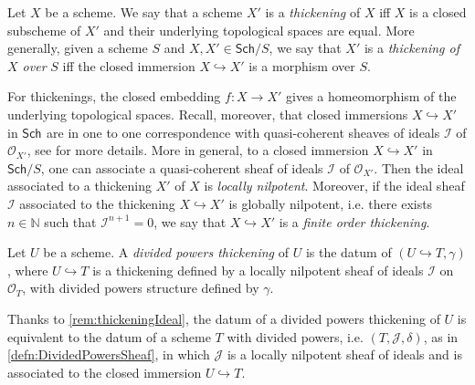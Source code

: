 \begin{defn}[Thickening]
	Let $X$ be a scheme.
	We say that a scheme $X'$ is a {\em thickening} of $X$ iff
	$X$ is a closed subscheme of $X'$ and their underlying topological
	spaces are equal.
	More generally, given a scheme $S$ and $X, X' \in \mathsf{Sch}/S$,
	we say that $X'$ is a {\em thickening of $X$ over} $S$ iff
	the closed immersion $X \hookrightarrow X'$ is a morphism over $S$.
\end{defn}


\begin{rem}[]\label{rem:thickeningIdeal}
	For thickenings, the closed embedding $f\colon X \to X'$ gives a homeomorphism
	of the underlying topological spaces.
	Recall, moreover, that closed immersions $X \hookrightarrow X'$ in $\mathsf{Sch}_{  }$
	are in one to one correspondence with quasi-coherent sheaves of ideals
	$\mathcal{I}$ of $\mathcal{O}_{ X' }$, see
	\cite[\href{https://stacks.math.columbia.edu/tag/01QN}{Section 01QN}]{SP}
	for more details.
	More in general, to a closed immersion $X \hookrightarrow X'$ in
	$\mathsf{Sch}/S$, one can associate a quasi-coherent sheaf of ideals
	$\mathcal{I}$ of $\mathcal{O}_{ X' }$.
	Then the ideal associated to a thickening $X'$ of $X$ 
	is {\em locally nilpotent}.
	Moreover, if the ideal sheaf $\mathcal{I}$ associated to the thickening
	$X \hookrightarrow X'$ is globally nilpotent, i.e. there exists $n \in \mathbb{N}$
	such that $\mathcal{I}^{n+1} = 0$, we say that $X \hookrightarrow X'$ 
	is a {\em finite order thickening}.
\end{rem}


\begin{defn}\label{defn:PDThickening}
	Let $U$ be a scheme. A {\em divided powers thickening} of $U$ 
	is the datum of $\left(U \hookrightarrow T, \gamma\right)$,
	where $U \hookrightarrow T$ is a thickening defined by a locally nilpotent
	sheaf of ideals $\mathcal{I}$ on $\mathcal{O}_T$, 
	with divided powers structure defined by $\gamma$.
\end{defn}


\begin{rem}[]\label{rem:EquivPDThickening}
	Thanks to \cref{rem:thickeningIdeal}, the datum of a
	divided powers thickening of $U$ is equivalent to the datum of
	a scheme $T$ with divided powers, i.e.
	$\left(T, \mathcal{J}, \delta\right)$, as in \cref{defn:DividedPowersSheaf},
	in which $\mathcal{J}$ is a locally nilpotent sheaf of ideals
	and is associated to the closed immersion $U \hookrightarrow T$.
\end{rem}


